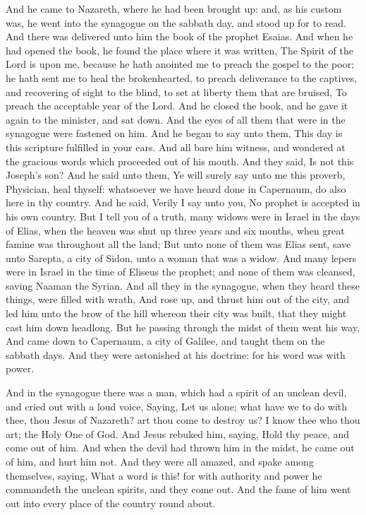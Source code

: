  And he came to Nazareth, where he had been brought up:
and, as his custom was, he went into the synagogue on the sabbath day,
and stood up for to read.  And there was delivered unto
him the book of the prophet Esaias. And when he had opened the book, he
found the place where it was written,  The Spirit of the
Lord is upon me, because he hath anointed me to preach the gospel to the
poor; he hath sent me to heal the brokenhearted, to preach deliverance
to the captives, and recovering of sight to the blind, to set at liberty
them that are bruised,  To preach the acceptable year of
the Lord.  And he closed the book, and he gave it again
to the minister, and sat down. And the eyes of all them that were in the
synagogue were fastened on him.  And he began to say unto
them, This day is this scripture fulfilled in your ears. 
And all bare him witness, and wondered at the gracious words which
proceeded out of his mouth. And they said, Is not this Joseph's son?
 And he said unto them, Ye will surely say unto me this
proverb, Physician, heal thyself: whatsoever we have heard done in
Capernaum, do also here in thy country.  And he said,
Verily I say unto you, No prophet is accepted in his own country.
 But I tell you of a truth, many widows were in Israel in
the days of Elias, when the heaven was shut up three years and six
months, when great famine was throughout all the land; 
But unto none of them was Elias sent, save unto Sarepta, a city of
Sidon, unto a woman that was a widow.  And many lepers
were in Israel in the time of Eliseus the prophet; and none of them was
cleansed, saving Naaman the Syrian.  And all they in the
synagogue, when they heard these things, were filled with wrath,
 And rose up, and thrust him out of the city, and led him
unto the brow of the hill whereon their city was built, that they might
cast him down headlong.  But he passing through the midst
of them went his way,  And came down to Capernaum, a city
of Galilee, and taught them on the sabbath days.  And
they were astonished at his doctrine: for his word was with power.

 And in the synagogue there was a man, which had a spirit
of an unclean devil, and cried out with a loud voice, 
Saying, Let us alone; what have we to do with thee, thou Jesus of
Nazareth? art thou come to destroy us? I know thee who thou art; the
Holy One of God.  And Jesus rebuked him, saying, Hold thy
peace, and come out of him. And when the devil had thrown him in the
midst, he came out of him, and hurt him not.  And they
were all amazed, and spake among themselves, saying, What a word is
this! for with authority and power he commandeth the unclean spirits,
and they come out.  And the fame of him went out into
every place of the country round about.

